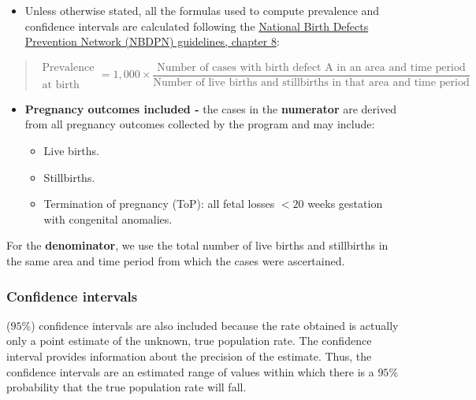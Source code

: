\documentclass[
]{krantz}
\providecommand{\tightlist}{%
  \setlength{\itemsep}{0pt}\setlength{\parskip}{0pt}}
\begin{document}
\begin{itemize}
\tightlist
\item
  Unless otherwise stated, all the formulas used to compute prevalence and confidence intervals are calculated following the \href{http://www.nbdpn.org/docs/Ch_8_Statistics6-04_2016DEC14.pdf}{National Birth Defects Prevention Network (NBDPN) guidelines, chapter 8}:
\end{itemize}

\begin{quote}
\[
\substack{\text{Prevalence} \\ \\ \text{at birth}} = 1,000 \times \dfrac{\text{Number of cases with birth defect A in an area and time period}}{\text{Number of live births and stillbirths in that area and time period}}
\]
\end{quote}

\begin{itemize}
\tightlist
\item
  \textbf{Pregnancy outcomes included -} the cases in the \textbf{numerator} are derived from all pregnancy outcomes collected by the program and may include:

  \begin{itemize}
  \tightlist
  \item
    Live births.
  \item
    Stillbirths.
  \item
    Termination of pregnancy (ToP): all fetal losses \(< 20\) weeks gestation with congenital anomalies.
  \end{itemize}
\end{itemize}

For the \textbf{denominator}, we use the total number of live births and stillbirths in the same area and time period from which the cases were ascertained.

\hypertarget{confidence-intervals}{%
\subsubsection*{Confidence intervals}\label{confidence-intervals}}


(\(95\%\)) confidence intervals are also included because the rate obtained is actually only a point estimate of the unknown, true population rate. The confidence interval provides information about the precision of the estimate. Thus, the confidence intervals are an estimated range of values within which there is a \(95\%\) probability that the true population rate will fall.
\end{document}
